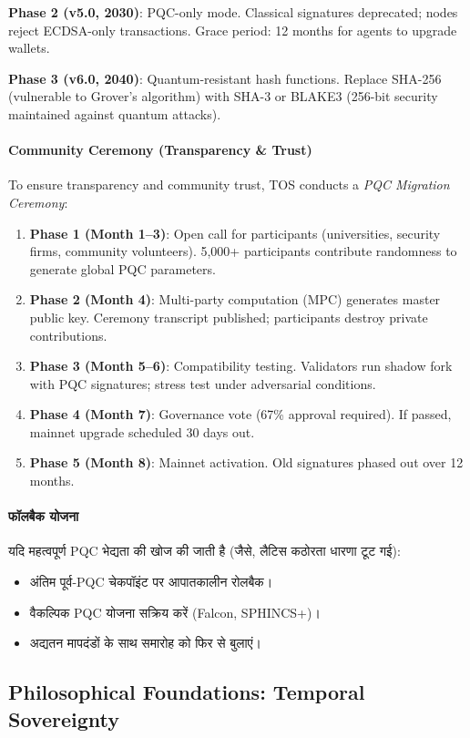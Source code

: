 \documentclass[11pt]{article}
\begin{document}
\begin{itemize}[noitemsep]
\begin{itemize}[noitemsep]
\textbf{Phase 2 (v5.0, 2030)}: PQC-only mode. Classical signatures deprecated; nodes reject ECDSA-only transactions. Grace period: 12 months for agents to upgrade wallets.

\textbf{Phase 3 (v6.0, 2040)}: Quantum-resistant hash functions. Replace SHA-256 (vulnerable to Grover's algorithm) with SHA-3 or BLAKE3 (256-bit security maintained against quantum attacks).

\paragraph{Community Ceremony (Transparency \& Trust)}
To ensure transparency and community trust, TOS conducts a \emph{PQC Migration Ceremony}:
\begin{enumerate}[noitemsep]
  \item \textbf{Phase 1 (Month 1--3)}: Open call for participants (universities, security firms, community volunteers). 5,000+ participants contribute randomness to generate global PQC parameters.
  \item \textbf{Phase 2 (Month 4)}: Multi-party computation (MPC) generates master public key. Ceremony transcript published; participants destroy private contributions.
  \item \textbf{Phase 3 (Month 5--6)}: Compatibility testing. Validators run shadow fork with PQC signatures; stress test under adversarial conditions.
  \item \textbf{Phase 4 (Month 7)}: Governance vote (67\% approval required). If passed, mainnet upgrade scheduled 30 days out.
  \item \textbf{Phase 5 (Month 8)}: Mainnet activation. Old signatures phased out over 12 months.
\end{enumerate}

\paragraph{फॉलबैक योजना}
यदि महत्वपूर्ण PQC भेद्यता की खोज की जाती है (जैसे, लैटिस कठोरता धारणा टूट गई):
\begin{itemize}[noitemsep]
  \item अंतिम पूर्व-PQC चेकपॉइंट पर आपातकालीन रोलबैक।
  \item वैकल्पिक PQC योजना सक्रिय करें (Falcon, SPHINCS+)।
  \item अद्यतन मापदंडों के साथ समारोह को फिर से बुलाएं।
\end{itemize}

\subsection{Philosophical Foundations: Temporal Sovereignty}


\end{itemize}
\end{itemize}
\end{document}
